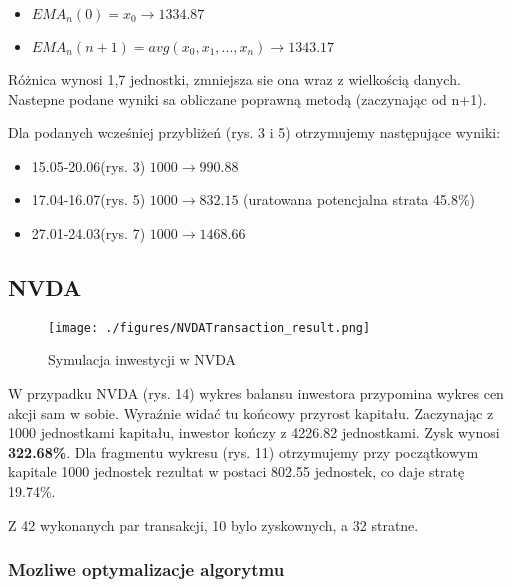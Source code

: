 \documentclass[a4paper,12pt]{article}  %
\begin{document}

\begin{itemize}
  \item $EMA_{n}(0) = x_0 \rightarrow 1334.87$  
  \item $EMA_{n}(n+1) = avg(x_0, x_1, ..., x_n) \rightarrow 1343.17 $ 
\end{itemize}

Różnica wynosi 1,7 jednostki, zmniejsza sie ona wraz z wielkością danych.
Nastepne podane wyniki sa obliczane poprawną metodą (zaczynając od n+1).

\smallbreak
Dla podanych wcześniej przybliżeń (rys. 3 i 5) otrzymujemy następujące wyniki:

\begin{itemize}
  \item 15.05-20.06(rys. 3)  $1000 \rightarrow 990.88$
  \item 17.04-16.07(rys. 5) $1000 \rightarrow 832.15$ (uratowana
    potencjalna strata 45.8\%)
  \item 27.01-24.03(rys. 7)  $1000 \rightarrow 1468.66$
\end{itemize}



\subsection{NVDA}

\begin{figure}[H]
  \centering
  \texttt{[image: ./figures/NVDATransaction\_result.png]}
  \caption{Symulacja inwestycji w NVDA}
\end{figure}

W przypadku NVDA (rys. 14) wykres balansu inwestora przypomina 
wykres cen akcji sam w sobie. Wyraźnie widać tu końcowy przyrost kapitału.
Zaczynając z 1000 jednostkami kapitału, inwestor kończy z 4226.82 jednostkami.
Zysk wynosi \textbf{322.68\%}. Dla fragmentu wykresu (rys. 11) otrzymujemy przy początkowym kapitale 1000
jednostek rezultat w postaci 802.55 jednostek, co daje stratę 19.74\%.

Z 42 wykonanych par transakcji, 10 bylo zyskownych, a 32 stratne.

\subsubsection{Mozliwe optymalizacje algorytmu}
\end{document}
